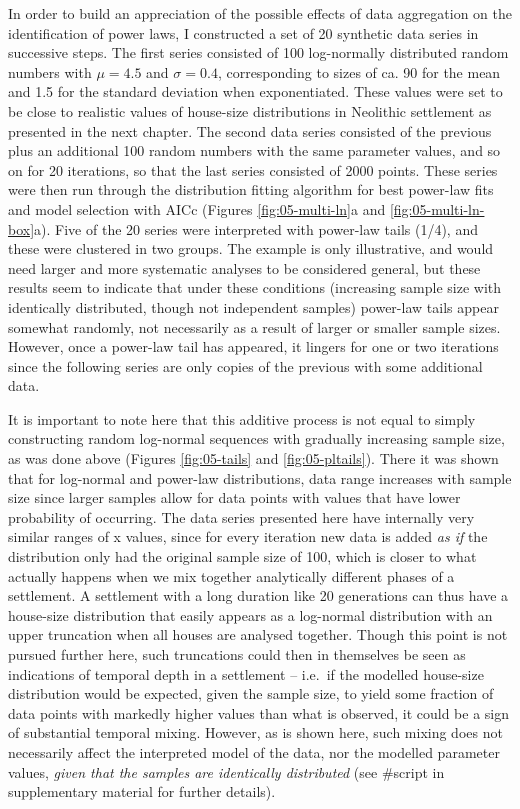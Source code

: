 \documentclass[
  12pt,
]{book}
\begin{document}
In order to build an appreciation of the possible effects of data aggregation on the identification of power laws, I constructed a set of 20 synthetic data series in successive steps. The first series consisted of 100 log-normally distributed random numbers with \(\mu = 4.5\) and \(\sigma = 0.4\), corresponding to sizes of ca. 90 for the mean and 1.5 for the standard deviation when exponentiated. These values were set to be close to realistic values of house-size distributions in Neolithic settlement as presented in the next chapter. The second data series consisted of the previous plus an additional 100 random numbers with the same parameter values, and so on for 20 iterations, so that the last series consisted of 2000 points. These series were then run through the distribution fitting algorithm for best power-law fits and model selection with AICc (Figures \ref{fig:05-multi-ln}a and \ref{fig:05-multi-ln-box}a). Five of the 20 series were interpreted with power-law tails (1/4), and these were clustered in two groups. The example is only illustrative, and would need larger and more systematic analyses to be considered general, but these results seem to indicate that under these conditions (increasing sample size with identically distributed, though not independent samples) power-law tails appear somewhat randomly, not necessarily as a result of larger or smaller sample sizes. However, once a power-law tail has appeared, it lingers for one or two iterations since the following series are only copies of the previous with some additional data.

It is important to note here that this additive process is not equal to simply constructing random log-normal sequences with gradually increasing sample size, as was done above (Figures \ref{fig:05-tails} and \ref{fig:05-pltails}). There it was shown that for log-normal and power-law distributions, data range increases with sample size since larger samples allow for data points with values that have lower probability of occurring. The data series presented here have internally very similar ranges of x values, since for every iteration new data is added \emph{as if} the distribution only had the original sample size of 100, which is closer to what actually happens when we mix together analytically different phases of a settlement. A settlement with a long duration like 20 generations can thus have a house-size distribution that easily appears as a log-normal distribution with an upper truncation when all houses are analysed together. Though this point is not pursued further here, such truncations could then in themselves be seen as indications of temporal depth in a settlement -- i.e.~if the modelled house-size distribution would be expected, given the sample size, to yield some fraction of data points with markedly higher values than what is observed, it could be a sign of substantial temporal mixing. However, as is shown here, such mixing does not necessarily affect the interpreted model of the data, nor the modelled parameter values, \emph{given that the samples are identically distributed} (see \#script in supplementary material for further details).
\end{document}
